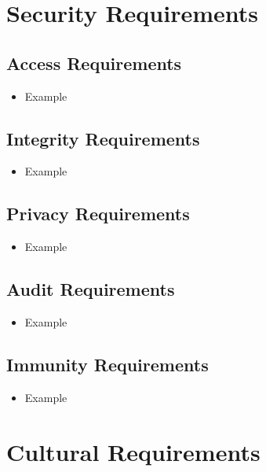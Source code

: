 \documentclass[12pt]{article}
\begin{document}
\section{Security Requirements}
  \subsection{Access Requirements}
    \begin{itemize}
      \item Example
    \end{itemize}

  \subsection{Integrity Requirements}
    \begin{itemize}
      \item Example
    \end{itemize}

  \subsection{Privacy Requirements}
    \begin{itemize}
      \item Example
    \end{itemize}

  \subsection{Audit Requirements}
    \begin{itemize}
      \item Example
    \end{itemize}

  \subsection{Immunity Requirements}
    \begin{itemize}
      \item Example
    \end{itemize}

\section{Cultural Requirements}
\end{document}
